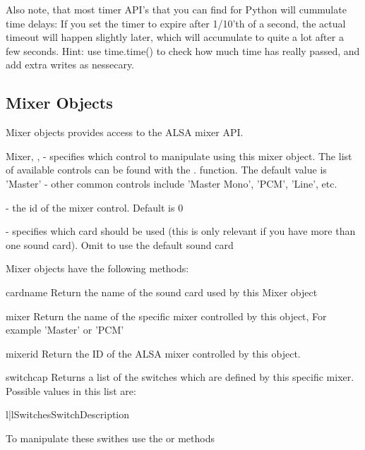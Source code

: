 Also note, that most timer API's that you can find for Python will cummulate time delays: If you set the timer
to expire after 1/10'th of a second, the actual timeout will happen slightly later, which will accumulate to
quite a lot after a few seconds. Hint: use time.time() to check how much time has really passed, and add
extra writes as nessecary.

\subsection{Mixer Objects}
\label{mixer-objects}

Mixer objects provides access to the ALSA mixer API.

\begin{classdesc}{Mixer}{, , }
 - specifies which control to manipulate using this mixer object. The list
of available controls can be found with the . function.
The default value is 'Master' - other common controls include 'Master Mono', 'PCM', 'Line', etc.

 - the id of the mixer control. Default is 0

 - specifies which card should be used (this is only relevant 
if you have more than one sound card). Omit to use the default sound card
\end{classdesc}

Mixer objects have the following methods:

\begin{methoddesc}[Mixer]{cardname}{}
Return the name of the sound card used by this Mixer object
\end{methoddesc}

\begin{methoddesc}[Mixer]{mixer}{}
Return the name of the specific mixer controlled by this object, For example 'Master'
or 'PCM'
\end{methoddesc}

\begin{methoddesc}[Mixer]{mixerid}{}
Return the ID of the ALSA mixer controlled by this object.
\end{methoddesc}

\begin{methoddesc}[Mixer]{switchcap}{}
Returns a list of the switches which are defined by this specific mixer. Possible values in
this list are:

\begin{tableii}{l|l}{Switches}{Switch}{Description}
\end{tableii}

To manipulate these swithes use the  or  methods
\end{methoddesc}


